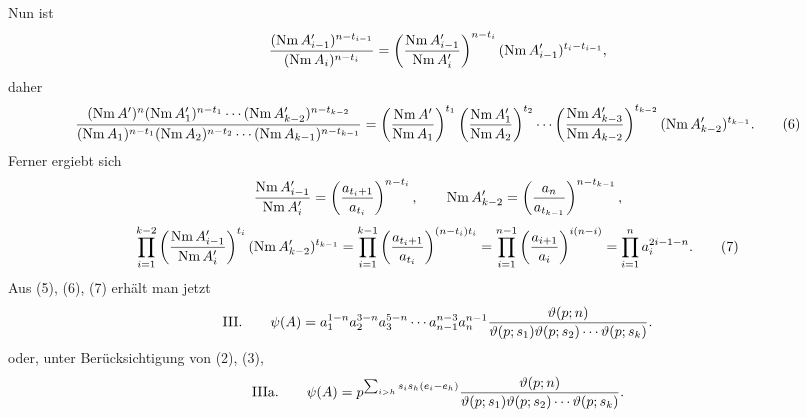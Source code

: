 \documentclass[11pt,a4paper]{article}
\newcommand{\Nm}{\operatorname{Nm}}
\newcommand{\tht}{\vartheta}
\begin{document}
Nun ist
\[
 { (\Nm A_{i-1}')^{n-t_{i-1}}
 \over (\Nm A_i)^{n-t_i} }
 =\left({\Nm A_{i-1}'\over\Nm A_i'}\right)^{n-t_i}(\Nm A_{i-1}')^{t_i-t_{i-1}},
\]
daher
\begin{equation}
 { (\Nm A')^n(\Nm A_1')^{n-t_1}\cdots(\Nm A_{k-2}')^{n-t_{k-2}}
 \over
 (\Nm A_1)^{n-t_1}(\Nm A_2)^{n-t_2}\cdots(\Nm A_{k-1})^{n-t_{k-1}} }
 =\left({\Nm A'\over\Nm A_1}\right)^{t_1}
 \left({\Nm A_1'\over\Nm A_2}\right)^{t_2}
 \cdots
 \left({\Nm A_{k-3}'\over\Nm A_{k-2}}\right)^{t_{k-2}}
 (\Nm A_{k-2}')^{t_{k-1}}.
\tag{6}
\end{equation}
Ferner ergiebt sich
\[
 {\Nm A_{i-1}'\over\Nm A_i'}=\left({a_{t_i+1}\over a_{t_i}}\right)^{n-t_i},
 \qquad
 \Nm A_{k-2}'=\left({a_n\over a_{t_{k-1}}}\right)^{n-t_{k-1}},
\]
\begin{equation}
 \prod_{i=1}^{k-2}\left({\Nm A_{i-1}'\over\Nm A_i'}\right)^{t_i}
 (\Nm A_{k-2}')^{t_{k-1}}
 =\prod_{i=1}^{k-1}\left({a_{t_i+1}\over a_{t_i}}\right)^{(n-t_i)t_i}
 =\prod_{i=1}^{n-1}\left({a_{i+1}\over a_i}\right)^{i(n-i)}
 =\prod_{i=1}^n a_i^{2i-1-n}.
\tag{7}
\end{equation}
Aus (5), (6), (7) erhält man jetzt
\[
\text{III.}\qquad
 \psi(A)=a_1^{1-n}a_2^{3-n}a_3^{5-n}\cdots a_{n-1}^{n-3}a_n^{n-1}
 {\tht(p;n)\over\tht(p;s_1)\tht(p;s_2)\cdots\tht(p;s_k)}.
\]
oder, unter Berücksichtigung von (2), (3),
\[
\text{IIIa.}\qquad
 \psi(A)=p^{\sum_{i>h}s_i s_h(e_i-e_h)}
 {\tht(p;n)\over\tht(p;s_1)\tht(p;s_2)\cdots\tht(p;s_k)}.
\]
\end{document}
